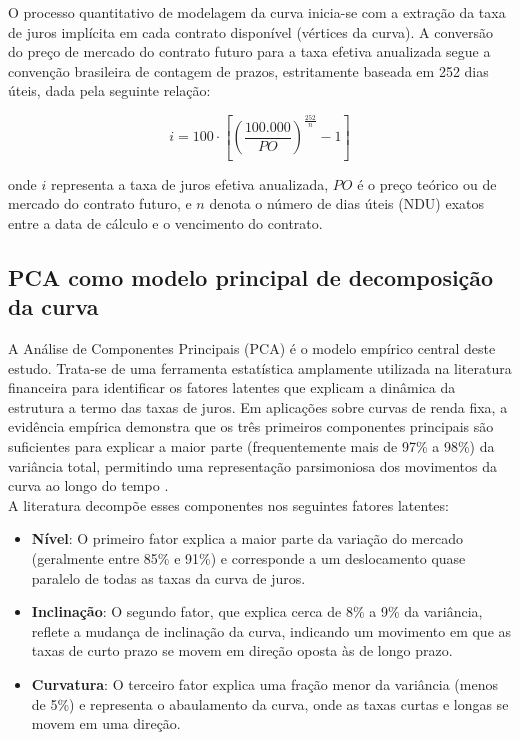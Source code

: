 \documentclass[fleqn]{rbfin}
\begin{document}
O processo quantitativo de modelagem da curva inicia-se com a extração da taxa de juros implícita em cada contrato disponível (vértices da curva). A conversão do preço de mercado do contrato futuro para a taxa efetiva anualizada segue a convenção brasileira de contagem de prazos, estritamente baseada em 252 dias úteis, dada pela seguinte relação:

$$i = 100 \cdot \left[ \left( \frac{100.000}{PO} \right)^{\frac{252}{n}} - 1 \right]$$

onde $i$ representa a taxa de juros efetiva anualizada, $PO$ é o preço teórico ou de mercado do contrato futuro, e $n$ denota o número de dias úteis (NDU) exatos entre a data de cálculo e o vencimento do contrato.




\subsection{PCA como modelo principal de decomposição da curva}

A Análise de Componentes Principais (PCA) é o modelo empírico central deste estudo. Trata-se de uma ferramenta estatística amplamente utilizada na literatura financeira para identificar os fatores latentes que explicam a dinâmica da estrutura a termo das taxas de juros. Em aplicações sobre curvas de renda fixa, a evidência empírica demonstra que os três primeiros componentes principais são suficientes para explicar a maior parte (frequentemente mais de 97\% a 98\%) da variância total, permitindo uma representação parsimoniosa dos movimentos da curva ao longo do tempo \cite{litterman1991common}. \\ 

A literatura decompõe esses componentes nos seguintes fatores latentes:

\begin{itemize}
    \item \textbf{Nível}:
    O primeiro fator explica a maior parte da variação do mercado (geralmente entre 85\% e 91\%) e corresponde a um deslocamento quase paralelo de todas as taxas da curva de juros. \\ 

    \item \textbf{Inclinação}:
    O segundo fator, que explica cerca de 8\% a 9\% da variância, reflete a mudança de inclinação da curva, indicando um movimento em que as taxas de curto prazo se movem em direção oposta às de longo prazo. \\ 

    \item \textbf{Curvatura}:
    O terceiro fator explica uma fração menor da variância (menos de 5\%) e representa o abaulamento da curva, onde as taxas curtas e longas se movem em uma direção.
    
\end{itemize}
\end{document}
